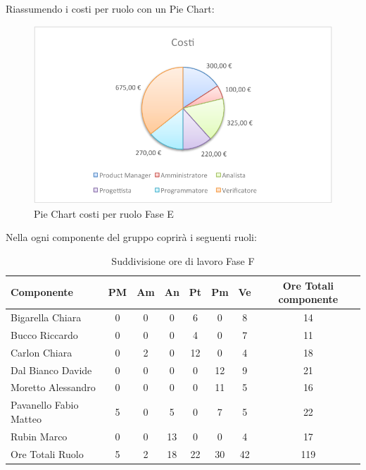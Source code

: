 				Riassumendo i costi per ruolo con un Pie Chart:
				\begin{figure}[H]\centering
					\includegraphics[width=\textwidth]{PianoDiProgetto/Pics/ChartTotCostiFaseE.pdf}
					\caption{Pie Chart costi per ruolo Fase E}
				\end{figure}
				Nella  ogni componente del gruppo \groupname{} coprirà i seguenti ruoli:
				\begin{table}[H]
					\begin{center}
						\begin{tabular}{| l | c | c | c | c | c | c | c |}
							\hline
							Componente 					& PM	& Am 	& An 	& Pt 		& Pm 	& Ve 		& Ore Totali componente \\ \hline
							
							Bigarella Chiara 			& 0		& 0		& 0		& 6 		& 0		& 8 		& 14 \\
							Bucco Riccardo 				& 0		& 0		& 0		& 4 		& 0		& 7 		& 11 \\
							Carlon Chiara	 			& 0		& 2 	& 0		& 12 		& 0		& 4 		& 18 \\
							Dal Bianco Davide 			& 0		& 0		& 0		& 0			& 12 	& 9 		& 21 \\
							Moretto Alessandro 			& 0		& 0		& 0		& 0			& 11 	& 5			& 16 \\
							Pavanello Fabio Matteo	 	& 5 	& 0		& 5		& 0			& 7 	& 5 		& 22 \\
							Rubin Marco					& 0		& 0		& 13 	& 0			& 0		& 4 		& 17 \\ \hline \hline
							
							Ore Totali Ruolo 			& 5 	& 2 	& 18 	& 22 		& 30 	& 42 		& 119\\ \hline
						\end{tabular}
					\end{center}
					\caption{Suddivisione ore di lavoro Fase F}
				\end{table}

